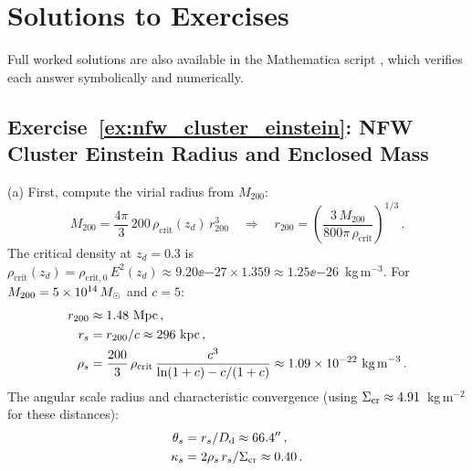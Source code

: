 
\section{Solutions to Exercises}
\label{sec:cluster_solutions}

\noindent
Full worked solutions are also available in the Mathematica script
,
which verifies each answer symbolically and numerically.

\subsection*{Exercise~\ref{ex:nfw_cluster_einstein}: NFW Cluster Einstein Radius and Enclosed Mass}

(a) First, compute the virial radius from $M_{200}$:
\begin{equation*}
    M_{200} = \frac{4\pi}{3}\, 200\,\rho_{\mathrm{crit}}(z_d)\, r_{200}^3
    \quad\Rightarrow\quad
    r_{200} = \left(\frac{3\, M_{200}}{800\pi\,\rho_{\mathrm{crit}}}
    \right)^{1/3} \,.
\end{equation*}
The critical density at $z_d = 0.3$ is
$\rho_{\mathrm{crit}}(z_d) = \rho_{\mathrm{crit},0}\, E^2(z_d)
\approx 9.20\ee{-27} \times 1.359 \approx 1.25\ee{-26}$~kg\,m$^{-3}$.
For $M_{200} = 5\times 10^{14}\,M_{\odot}$ and $c = 5$:
\begin{align*}
    r_{200} &\approx 1.48~\text{Mpc} \,, \\
    r_s &= r_{200}/c \approx 296~\text{kpc} \,, \\
    \rho_s &= \frac{200}{3}\,\rho_{\mathrm{crit}}\,
    \frac{c^3}{\ln(1+c) - c/(1+c)}
    \approx 1.09\times 10^{-22}~\text{kg\,m}^{-3} \,.
\end{align*}
The angular scale radius and characteristic convergence (using
$\Sigma_{\mathrm{cr}} \approx 4.91$~kg\,m$^{-2}$ for these distances):
\begin{align*}
    \theta_s &= r_s / D_{\mathrm{d}} \approx 66.4'' \,, \\
    \kappa_s &= 2\rho_s\, r_s / \Sigma_{\mathrm{cr}} \approx 0.40 \,.
\end{align*}

